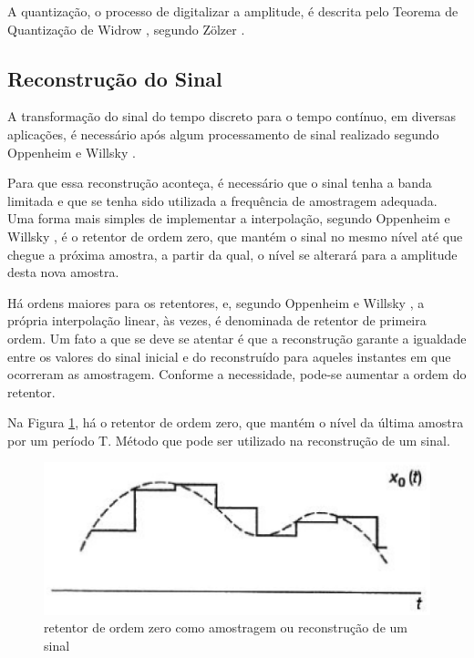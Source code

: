 A quantização, o processo de digitalizar a amplitude, é descrita pelo Teorema de Quantização de Widrow \cite{widrow}, segundo  Zölzer \cite{zolzer2008digital}.

\subsection{Reconstrução do Sinal}
A transformação do sinal do tempo discreto para o tempo contínuo, em diversas aplicações, é necessário após algum processamento de sinal realizado segundo Oppenheim e Willsky \cite{oppenheim2010sinais}.
\par
Para que essa reconstrução aconteça, é necessário que o sinal tenha a banda limitada e que se tenha sido utilizada a frequência de amostragem adequada. Uma forma mais simples de implementar a interpolação, segundo Oppenheim e Willsky \cite{oppenheim2010sinais}, é o retentor de ordem zero, que mantém o sinal no mesmo nível até que chegue a próxima amostra, a partir da qual, o nível se alterará para a amplitude desta nova amostra.
\par
Há ordens maiores para os retentores, e, segundo Oppenheim e Willsky \cite{oppenheim2010sinais}, a própria interpolação linear, às vezes, é denominada de retentor de primeira ordem. Um fato a que se deve se atentar é que a reconstrução garante a igualdade entre os valores do sinal inicial e do reconstruído para aqueles instantes em que ocorreram as amostragem.  Conforme a necessidade, pode-se aumentar a ordem do retentor.
\par
Na Figura \ref{fig05}, há o retentor de ordem zero, que mantém o nível da última amostra por um período T. Método que pode ser utilizado na reconstrução de um sinal.

\begin{figure}[h]
	\centering
    \includegraphics[scale=0.4]{figuras/fig05.eps}
	\caption{retentor de ordem zero como amostragem ou reconstrução de um sinal}
	\label{fig05}
\end{figure}

